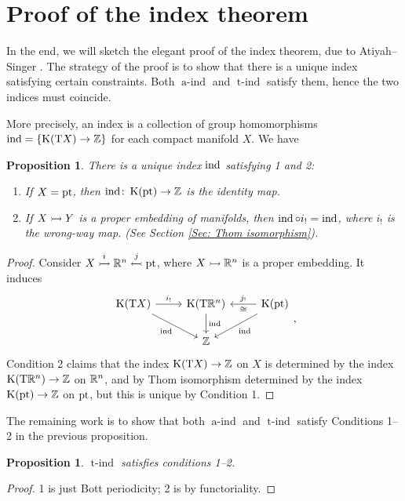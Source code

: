 \documentclass[reqno]{scrartcl}
\newtheorem{proposition}[theorem]{Proposition}
\theoremstyle{definition}
\theoremstyle{remark}
\newcommand{\aind}{\operatorname{a-ind}}
\newcommand{\tind}{\operatorname{t-ind}}
\begin{document}
\section{Proof of the index theorem}
In the end, we will sketch the elegant proof of the index theorem, due to Atiyah--Singer \cite{atiyahsinger1}. The strategy of the proof is to show that there is a unique index satisfying certain constraints. Both $\aind$ and $\tind$ satisfy them, hence the two indices must coincide.

More precisely, an index is a collection of group homomorphisms $\operatorname{ind}=\{\operatorname{K}(\mathrm{T}X)\to\mathbb{Z}\}$ for each compact manifold $X$. We have
\begin{proposition}
There is a unique index $\operatorname{ind}$ satisfying 1 and 2:
\begin{enumerate}
\item If $X=\operatorname{pt}$, then $\operatorname{ind}\colon\operatorname{K}(\operatorname{pt})\to\mathbb{Z}$ is the identity map.
\item If $X\rightarrowtail Y$ is a proper embedding of manifolds, then $\operatorname{ind}\circ i_!=\operatorname{ind}$, where $i_!$ is the wrong-way map. (See Section \ref{Sec: Thom isomorphism}).
\end{enumerate}
\end{proposition}

\begin{proof}
Consider $X\overset{i}{\rightarrowtail}\mathbb{R}^n\overset{j}{\leftarrowtail}\operatorname{pt}$, where $X\rightarrowtail\mathbb{R}^n$ is a proper embedding. It induces
\[ \begin{tikzcd}
\K(\mathrm{T}X) \arrow[r, "i_!"] \arrow[rd, "\ind"'] & \K(\mathrm{T}\R^n) \arrow[d, "\ind"] & \K(\pt) \arrow[ld, "\ind"] \arrow[l, "j_!"', "\cong"] \\
                                            & \Z                          &                                               
\end{tikzcd}, \]
Condition 2 claims that the index $\operatorname{K}(\mathrm{T}X)\to\mathbb{Z}$ on $X$ is determined by the index $\operatorname{K}(\mathrm{T}\mathbb{R}^n)\to\mathbb{Z}$ on $\mathbb{R}^n$, and by Thom isomorphism determined by the index $\operatorname{K}(\operatorname{pt})\to\mathbb{Z}$ on $\operatorname{pt}$, but this is unique by Condition 1.
\end{proof}

The remaining work is to show that both $\aind$ and $\tind$ satisfy Conditions 1--2 in the previous proposition.

\begin{proposition}
$\tind$ satisfies conditions 1--2.
\end{proposition}

\begin{proof}
1 is just Bott periodicity; 2 is by functoriality.
\end{proof}
\end{document}
